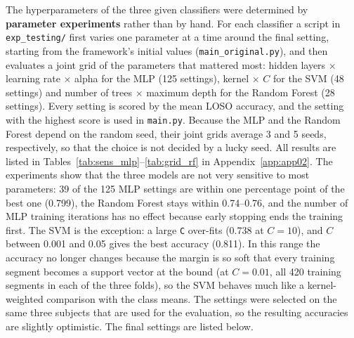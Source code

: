 The hyperparameters of the three given classifiers were determined by \textbf{parameter experiments} rather than by hand. For each classifier a script in \texttt{exp\_testing/} first varies one parameter at a time around the final setting, starting from the framework's initial values (\texttt{main\_original.py}), and then evaluates a joint grid of the parameters that mattered most: hidden layers $\times$ learning rate $\times$ alpha for the MLP (125 settings), kernel $\times$ $C$ for the SVM (48 settings) and number of trees $\times$ maximum depth for the Random Forest (28 settings). Every setting is scored by the mean LOSO accuracy, and the setting with the highest score is used in \texttt{main.py}. Because the MLP and the Random Forest depend on the random seed, their joint grids average 3 and 5 seeds, respectively, so that the choice is not decided by a lucky seed. All results are listed in Tables~\ref{tab:sens_mlp}--\ref{tab:grid_rf} in Appendix~\ref{app:app02}. The experiments show that the three models are not very sensitive to most parameters: 39 of the 125 MLP settings are within one percentage point of the best one (0.799), the Random Forest stays within 0.74--0.76, and the number of MLP training iterations has no effect because early stopping ends the training first. The SVM is the exception: a large \texttt{C} over-fits (0.738 at $C=10$), and $C$ between 0.001 and 0.05 gives the best accuracy (0.811). In this range the accuracy no longer changes because the margin is so soft that every training segment becomes a support vector at the bound (at $C=0.01$, all 420 training segments in each of the three folds), so the SVM behaves much like a kernel-weighted comparison with the class means. The settings were selected on the same three subjects that are used for the evaluation, so the resulting accuracies are slightly optimistic. The final settings are listed below.

